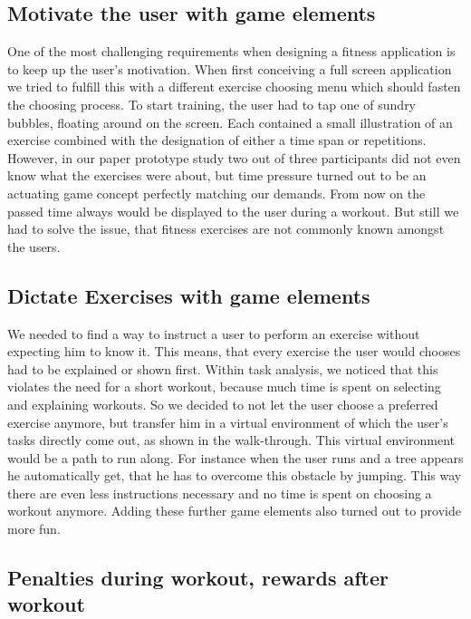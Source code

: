 \documentclass{sigchi}
\begin{document}
  \subsection{Motivate the user with game elements } %
  \label{sub:motivate_the_user_with_game_elements_}

    One of the most challenging requirements when designing a fitness application is to keep up the user's motivation. When first conceiving a full screen application we tried to fulfill this with a different exercise choosing menu which should fasten the choosing process. To start training, the user had to tap one of sundry bubbles, floating around on the screen. Each contained a small illustration of an exercise combined with the designation of either a time span or repetitions. However, in our paper prototype study two out of three participants did not even know what the exercises were about, but time pressure turned out to be an actuating game concept perfectly matching our demands. From now on the passed time always would be displayed to the user during a workout. But still we had to solve the issue, that fitness exercises are not commonly known amongst the users.

  \subsection{Dictate Exercises with game elements } %
  \label{sub:dictate_exercises_with_game_elements_}

    We needed to find a way to instruct a user to perform an exercise without expecting him to know it. This means, that every exercise the user would chooses had to be explained or shown first. Within task analysis, we noticed that this violates the need for a short workout, because much time is spent on selecting and explaining workouts. So we decided to not let the user choose a preferred exercise anymore, but transfer him in a virtual environment of which the user's tasks directly come out, as shown in the walk-through. This virtual environment would be a path to run along. For instance when the user runs and a tree appears he automatically get, that he has to overcome this obstacle by jumping. This way there are even less instructions necessary and no time is spent on choosing a workout anymore. Adding these further game elements also turned out to provide more fun.

  \subsection{Penalties during workout, rewards after workout} %
  \label{sub:penalties_during_workout_rewards_after_workout}
\end{document}
